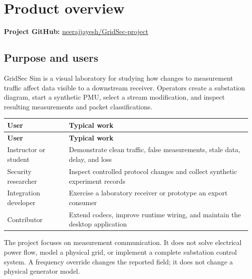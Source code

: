 \chapter{Product overview}\label{chapter-1}
\textbf{Project GitHub:} \href{https://github.com/neerajjayesh/GridSec-project}{neerajjayesh/GridSec-project}

\section*{Purpose and users}
GridSec Sim is a visual laboratory for studying how changes to measurement traffic affect data visible to a downstream receiver. Operators create a substation diagram, start a synthetic PMU, select a stream modification, and inspect resulting measurements and packet classifications.

\begingroup
\fontsize{8.7}{11.8}\selectfont
\setlength{\tabcolsep}{5pt}
\renewcommand{\arraystretch}{1.23}
\begin{longtable}{@{}>{\raggedright\arraybackslash}p{}>{\raggedright\arraybackslash}p{}@{}}
\rowcolor{navy} \color{white}\bfseries User & \color{white}\bfseries Typical work \\
\endfirsthead
\rowcolor{navy} \color{white}\bfseries User & \color{white}\bfseries Typical work \\
\endhead
\endfoot
\rowcolor{pale}
Instructor or student & Demonstrate clean traffic, false measurements, stale data, delay, and loss \\
Security researcher & Inspect controlled protocol changes and collect synthetic experiment records \\
\rowcolor{pale}
Integration developer & Exercise a laboratory receiver or prototype an export consumer \\
Contributor & Extend codecs, improve runtime wiring, and maintain the desktop application \\
\end{longtable}
\endgroup

The project focuses on measurement communication. It does not solve electrical power flow, model a physical grid, or implement a complete substation control system. A frequency override changes the reported field; it does not change a physical generator model.

